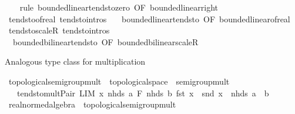 \begin{isabellebody}
%
\isadelimproof
\ \ %
\endisadelimproof
%
\isatagproof
{}\isamarkupfalse%
\ {\isacharparenleft}{\kern0pt}rule\ bounded{\isacharunderscore}{\kern0pt}linear{\isachardot}{\kern0pt}tendsto{\isacharunderscore}{\kern0pt}zero\ {\isacharbrackleft}{\kern0pt}OF\ bounded{\isacharunderscore}{\kern0pt}linear{\isacharunderscore}{\kern0pt}right{\isacharbrackright}{\kern0pt}{\isacharparenright}{\kern0pt}%
\endisatagproof
{\isafoldproof}%
%
\isadelimproof
\isanewline
%
\endisadelimproof
\isanewline
{}\isamarkupfalse%
\ tendsto{\isacharunderscore}{\kern0pt}of{\isacharunderscore}{\kern0pt}real\ {\isacharbrackleft}{\kern0pt}tendsto{\isacharunderscore}{\kern0pt}intros{\isacharbrackright}{\kern0pt}\ {\isacharequal}{\kern0pt}\isanewline
\ \ bounded{\isacharunderscore}{\kern0pt}linear{\isachardot}{\kern0pt}tendsto\ {\isacharbrackleft}{\kern0pt}OF\ bounded{\isacharunderscore}{\kern0pt}linear{\isacharunderscore}{\kern0pt}of{\isacharunderscore}{\kern0pt}real{\isacharbrackright}{\kern0pt}\isanewline
\isanewline
{}\isamarkupfalse%
\ tendsto{\isacharunderscore}{\kern0pt}scaleR\ {\isacharbrackleft}{\kern0pt}tendsto{\isacharunderscore}{\kern0pt}intros{\isacharbrackright}{\kern0pt}\ {\isacharequal}{\kern0pt}\isanewline
\ \ bounded{\isacharunderscore}{\kern0pt}bilinear{\isachardot}{\kern0pt}tendsto\ {\isacharbrackleft}{\kern0pt}OF\ bounded{\isacharunderscore}{\kern0pt}bilinear{\isacharunderscore}{\kern0pt}scaleR{\isacharbrackright}{\kern0pt}%
\begin{isamarkuptext}%
Analogous type class for multiplication%
\end{isamarkuptext}\isamarkuptrue%
\isamarkupfalse%
\ topological{\isacharunderscore}{\kern0pt}semigroup{\isacharunderscore}{\kern0pt}mult\ {\isacharequal}{\kern0pt}\ topological{\isacharunderscore}{\kern0pt}space\ {\isacharplus}{\kern0pt}\ semigroup{\isacharunderscore}{\kern0pt}mult\ {\isacharplus}{\kern0pt}\isanewline
\ \ \ tendsto{\isacharunderscore}{\kern0pt}mult{\isacharunderscore}{\kern0pt}Pair{\isacharcolon}{\kern0pt}\ {\isachardoublequoteopen}LIM\ x\ {\isacharparenleft}{\kern0pt}nhds\ a\ {\isasymtimes}\isactrlsub F\ nhds\ b{\isacharparenright}{\kern0pt}{\isachardot}{\kern0pt}\ fst\ x\ {\isacharasterisk}{\kern0pt}\ snd\ x\ {\isacharcolon}{\kern0pt}{\isachargreater}{\kern0pt}\ nhds\ {\isacharparenleft}{\kern0pt}a\ {\isacharasterisk}{\kern0pt}\ b{\isacharparenright}{\kern0pt}{\isachardoublequoteclose}\isanewline
\isanewline
{}\isamarkupfalse%
\ real{\isacharunderscore}{\kern0pt}normed{\isacharunderscore}{\kern0pt}algebra\ {\isacharless}{\kern0pt}\ topological{\isacharunderscore}{\kern0pt}semigroup{\isacharunderscore}{\kern0pt}mult\isanewline

\end{isabellebody}
